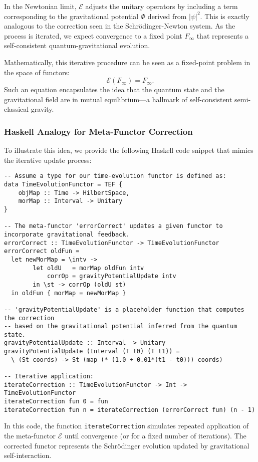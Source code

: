 \documentclass[12pt]{article}
\begin{document}
In the Newtonian limit, \(\mathcal{E}\) adjusts the unitary operators by including a term corresponding to the gravitational potential \(\Phi\) derived from \(|\psi|^2\). This is exactly analogous to the correction seen in the Schrödinger-Newton system. As the process is iterated, we expect convergence to a fixed point \(F_\infty\) that represents a self-consistent quantum-gravitational evolution.

Mathematically, this iterative procedure can be seen as a fixed-point problem in the space of functors:
\[
\mathcal{E}(F_\infty) = F_\infty.
\]
Such an equation encapsulates the idea that the quantum state and the gravitational field are in mutual equilibrium—a hallmark of self-consistent semi-classical gravity.

\subsubsection*{Haskell Analogy for Meta-Functor Correction}
To illustrate this idea, we provide the following Haskell code snippet that mimics the iterative update process:

\begin{lstlisting}[caption={Iterative Correction Using a Meta-Functor in Haskell}]
-- Assume a type for our time-evolution functor is defined as:
data TimeEvolutionFunctor = TEF {
    objMap :: Time -> HilbertSpace,
    morMap :: Interval -> Unitary
}

-- The meta-functor 'errorCorrect' updates a given functor to incorporate gravitational feedback.
errorCorrect :: TimeEvolutionFunctor -> TimeEvolutionFunctor
errorCorrect oldFun =
  let newMorMap = \intv ->
        let oldU   = morMap oldFun intv
            corrOp = gravityPotentialUpdate intv
        in \st -> corrOp (oldU st)
  in oldFun { morMap = newMorMap }

-- 'gravityPotentialUpdate' is a placeholder function that computes the correction
-- based on the gravitational potential inferred from the quantum state.
gravityPotentialUpdate :: Interval -> Unitary
gravityPotentialUpdate (Interval (T t0) (T t1)) =
  \ (St coords) -> St (map (* (1.0 + 0.01*(t1 - t0))) coords)

-- Iterative application:
iterateCorrection :: TimeEvolutionFunctor -> Int -> TimeEvolutionFunctor
iterateCorrection fun 0 = fun
iterateCorrection fun n = iterateCorrection (errorCorrect fun) (n - 1)
\end{lstlisting}

In this code, the function \texttt{iterateCorrection} simulates repeated application of the meta-functor \(\mathcal{E}\) until convergence (or for a fixed number of iterations). The corrected functor represents the Schrödinger evolution updated by gravitational self-interaction.
\end{document}
